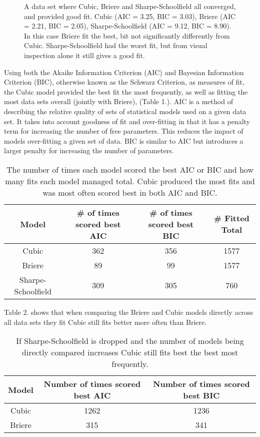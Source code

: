 \documentclass[11pt]{article}
\begin{document}
 \begin{figure}[!htb]
        \caption{\label{fig:my-label} A data set where Cubic, Briere and Sharpe-Schoolfield all converged, and provided good fit. Cubic (AIC = 3.25, BIC = 3.03), Briere (AIC = 2.21, BIC = 2.05), Sharpe-Schoolfield (AIC = 9.12, BIC = 8.90). In this case Briere fit the best, bit not significantly differently from Cubic. Sharpe-Schoolfield had the worst fit, but from visual inspection alone it still gives a good fit.}
      \end{figure}
    

Using both the Akaike Information Criterion (AIC) and Bayesian Information Criterion (BIC), otherwise known as the Schwarz Criterion,  as measures of fit, the Cubic model provided the best fit the most frequently, as well as fitting the most data sets overall (jointly with Briere), (Table 1.). 
AIC is a method of describing the relative quality of sets of statistical models used on a given data set. It takes into account goodness of fit and over-fitting in that it has a penalty term for increasing the number of free parameters. This reduces the impact of models over-fitting a given set of data. BIC is similar to AIC but introduces a larger penalty for increasing the number of parameters.


\begin{table}[h]
    \centering
    \caption{The number of times each model scored the best AIC or BIC and how many fits each model managed total. Cubic produced the most fits and was most often scored best in both AIC and BIC.\\}
    \begin{tabular}{c|c|c|c}
    \toprule
          Model & \# of times scored best AIC & \# of times scored best BIC & \# Fitted  Total\\ \midrule
 Cubic & 362 & 356 & 1577\\ 
 Briere & 89 & 99 & 1577\\  
 Sharpe-Schoolfield & 309 & 305 & 760 \\   \bottomrule
    \end{tabular}
    \label{tab:my_label}
\end{table}

Table 2. shows that when comparing the Briere and Cubic models directly across all data sets they fit Cubic still fits better more often than Briere. 

\begin{table}[h]
    \centering
    \caption{If Sharpe-Schoolfield is dropped and the number of models being directly compared increases Cubic still fits best the best most frequently.\\}
    \begin{tabular}{c|c|c}
    \toprule
      Model & Number of times scored best AIC & Number of times scored best BIC\\ \midrule
 Cubic & 1262 & 1236\\ 
 Briere & 315 & 341 \\  \bottomrule
    \end{tabular}
    \label{tab:my_label}
\end{table}
\end{document}
